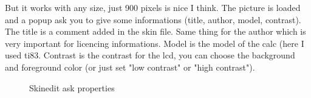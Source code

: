 \documentclass[10pt]{report}
\begin{document}
But it works with any size, just 900 pixels is nice I think.\newline
The picture is loaded and a popup ask you to give some informations (title, author, model, contrast).\newline
The title is a comment added in the skin file.\newline
Same thing for the author which is very important for licencing informations.\newline
Model is the model of the calc (here I used ti83.\newline
Contrast is the contrast for the lcd, you can choose the background and foreground color (or just set "low contrast" or "high contrast").\newline

\begin{figure}[H]
\centering
{}
\caption{Skinedit ask properties}
\end{figure}
\end{document}
